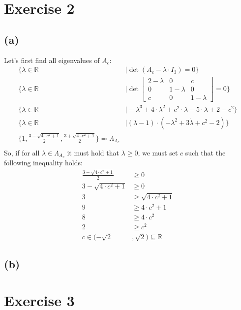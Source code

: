 \documentclass[12pt]{article}
\begin{document}
\section*{Exercise 2}
\subsection*{(a)}
Let's first find all eigenvalues of $A_c$:
\begin{align*}
	\{ \lambda \in \mathbb{R} &\mid \det\left( A_c - \lambda \cdot I_3 \right) = 0\} \\
	\{ \lambda \in \mathbb{R} &\mid \det\left[ \begin{array}{ccc} 2 - \lambda & 0 & c \\ 0 & 1 - \lambda & 0 \\ c & 0 & 1 - \lambda \end{array} \right] = 0\} \\
	\{ \lambda \in \mathbb{R} &\mid -\lambda^3 + 4 \cdot \lambda^2 + c^2 \cdot \lambda - 5 \cdot \lambda + 2 -c^2\} \\
	\{ \lambda \in \mathbb{R} &\mid (\lambda - 1) \cdot (-\lambda^2 + 3 \dot \lambda + c^2 - 2)\} \\
	\{ 1, \frac{3 - \sqrt{4 \cdot c^2 + 1}}{2}, \frac{3 + \sqrt{4 \cdot c^2 + 1}}{2}\} \eqqcolon \Lambda_{A_c}\\
\end{align*}
So, if for all $\lambda \in \Lambda_{A_c}$ it must hold that $\lambda \geq 0$, we must set $c$ such that the following inequality holds:
\begin{align*}
	\frac{3 - \sqrt{4 \cdot c^2 + 1}}{2} &\geq 0 \\
	3 - \sqrt{4 \cdot c^2 + 1} &\geq 0 \\
	3 &\geq \sqrt{4 \cdot c^2 + 1} \\
	9 &\geq 4 \cdot c^2 + 1 \\
	8 &\geq 4 \cdot c^2 \\
	2 &\geq c^2 \\
	c \in (-\sqrt{2}&, \sqrt{2}) \subseteq \mathbb{R}
\end{align*}

\subsection*{(b)}

\section*{Exercise 3}
\end{document}
